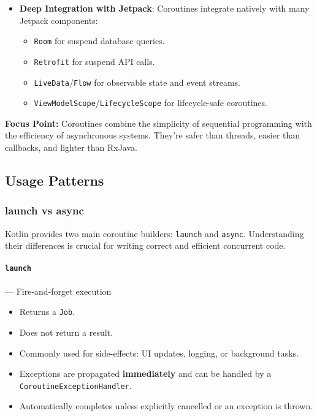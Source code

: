 \documentclass[a4paper,12pt]{article}
\begin{document}
\begin{itemize}
  \item \textbf{Deep Integration with Jetpack}:  
  Coroutines integrate natively with many Jetpack components:
  \begin{itemize}
    \item \texttt{Room} for suspend database queries.
    \item \texttt{Retrofit} for suspend API calls.
    \item \texttt{LiveData}/\texttt{Flow} for observable state and event streams.
    \item \texttt{ViewModelScope}/\texttt{LifecycleScope} for lifecycle-safe coroutines.
  \end{itemize}
\end{itemize}

\textbf{Focus Point:}  
Coroutines combine the simplicity of sequential programming with the efficiency of asynchronous systems. They’re safer than threads, easier than callbacks, and lighter than RxJava.


\subsection{Usage Patterns}

\subsubsection{launch vs async}

Kotlin provides two main coroutine builders: \texttt{launch} and \texttt{async}. Understanding their differences is crucial for writing correct and efficient concurrent code.

\paragraph{\texttt{launch}} — Fire-and-forget execution

\begin{itemize}
  \item Returns a \texttt{Job}.
  \item Does not return a result.
  \item Commonly used for side-effects: UI updates, logging, or background tasks.
  \item Exceptions are propagated \textbf{immediately} and can be handled by a \texttt{CoroutineExceptionHandler}.
  \item Automatically completes unless explicitly cancelled or an exception is thrown.
\end{itemize}
\end{document}
